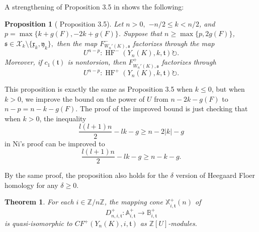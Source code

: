 \documentclass{article}
\newtheorem{theorem}[equation]{Theorem}
\newtheorem{proposition}[equation]{Proposition}
\theoremstyle{remark}
\numberwithin{equation}{section}
\numberwithin{table}{section}
\renewcommand{\frak}{\mathfrak}
\DeclareMathOperator{\HF}{HF}
\renewcommand{\(}{\left(}
\renewcommand{\)}{\right)}
\newcommand{\Z}{{\mathbb{Z}}}
\newcommand{\A}{{\mathbb{A}}}
\newcommand{\B}{{\mathbb{B}}}
\newcommand{\X}{{\mathbb{X}}}
\begin{document}
A strengthening of Proposition 3.5 in \cite{ni-property-g} shows the following:

\begin{proposition}[\cite{ni-property-g} Proposition 3.5]\label{thm:ni-3.5}
Let $n>0,$ $-n/2\le k< n/2$, and $p=\max\{k+g(F),-2k+g(F)\}$. Suppose that $n\ge\max\{p,2g(F)\}$, $\frak s\in\mathcal X_k\setminus\{\frak x_k,\frak y_k\},$ then the map $F_{W_n'(K),\frak s}^-$ factorizes through the map
$$U^{n-p}:\HF^-(Y_n(K),k,\frak t)\circlearrowright.$$
Moreover, if $c_1(\frak t)$ is nontorsion, then $F_{W_n'(K),\frak s}^+$ factorizes through
$$U^{n-p}:\HF^+(Y_n(K),k,\frak t)\circlearrowright.$$
\end{proposition}

This proposition is exactly the same as \cite{ni-property-g} Proposition 3.5 when $k\le 0$, but when $k>0$, we improve the bound on the power of $U$ from $n-2k-g(F)$ to $n-p=n-k-g(F)$. The proof of the improved bound is just checking that when $k>0$, the inequality
$$\frac{l(l+1)n}{2}-lk-g\ge n-2|k|-g$$ in Ni's proof can be improved to
$$\frac{l(l+1)n}{2}-lk-g\ge n-k-g.$$

By the same proof, the proposition also holds for the $\delta$ version of Heegaard Floer homology for any $\delta\ge 0$. 


\begin{theorem}\label{thm:mc-integer}
For each $i\in\Z/n\Z$, the mapping cone $\X_{i,\frak t}^+(n)$ of 
$$D_{n,i,\frak t}^+:\A_{i,\frak t}^+\to\B_{i,\frak t}^+$$ is quasi-isomorphic to $CF^+(Y_n(K),i,\frak t)$ as $\Z[U]$-modules.
\end{theorem}
\end{document}
